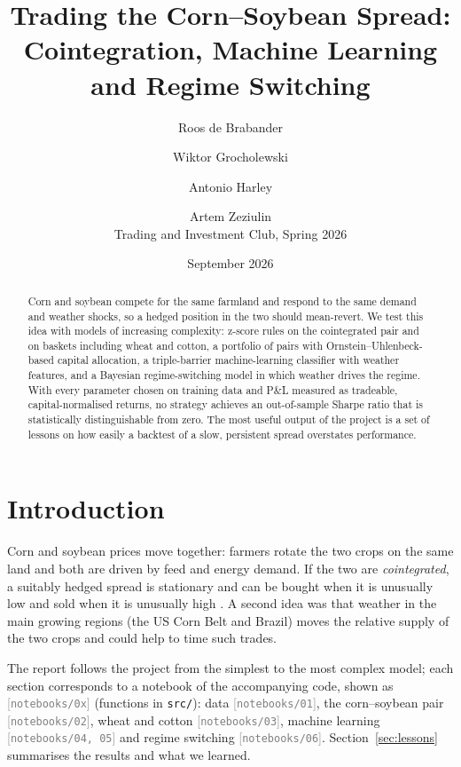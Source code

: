 \documentclass[11pt,a4paper]{article}
\title{\vspace{-1.2cm}Trading the Corn--Soybean Spread:\\ Cointegration, Machine Learning and Regime Switching}
\author{Roos de Brabander \and Wiktor Grocholewski \and Antonio Harley \and Artem Zeziulin\\[2pt]
\small Trading and Investment Club, Spring 2026}
\date{\small September 2026}
\newcommand{\nb}[1]{\textcolor{gray}{\small[\texttt{notebooks/#1}]}}
\begin{document}
\maketitle
\vspace{-0.6cm}

\begin{abstract}
\noindent
Corn and soybean compete for the same farmland and respond to the same demand and weather shocks, so a hedged
position in the two should mean-revert. We test this idea with models of increasing complexity: z-score rules on the
cointegrated pair and on baskets including wheat and cotton, a portfolio of pairs with Ornstein--Uhlenbeck-based
capital allocation, a triple-barrier machine-learning classifier with weather features, and a Bayesian regime-switching
model in which weather drives the regime. With every parameter chosen on training data and P\&L measured as
tradeable, capital-normalised returns, no strategy achieves an out-of-sample Sharpe ratio that is statistically
distinguishable from zero. The most useful output of the project is a set of lessons on how easily a backtest of a
slow, persistent spread overstates performance.
\end{abstract}

\section{Introduction}
Corn and soybean prices move together: farmers rotate the two crops on the same land and both are driven by feed
and energy demand. If the two are \emph{cointegrated}, a suitably hedged spread is stationary and can be bought when it is
unusually low and sold when it is unusually high \citep{chan2013}. A second idea was that weather in the main
growing regions (the US Corn Belt and Brazil) moves the relative supply of the two crops and could help to time
such trades.

The report follows the project from the simplest to the most complex model; each section corresponds to a notebook
of the accompanying code, shown as \nb{0x} (functions in \texttt{src/}): data \nb{01}, the corn--soybean pair
\nb{02}, wheat and cotton \nb{03}, machine learning \nb{04, 05} and regime switching \nb{06}.
Section~\ref{sec:lessons} summarises the results and what we learned.
\end{document}
